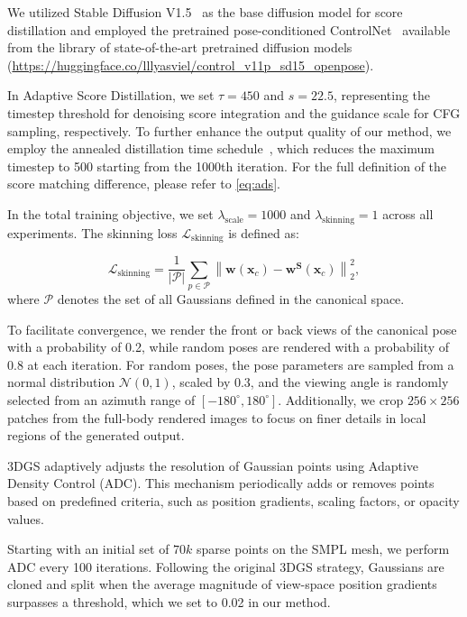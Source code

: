 We utilized Stable Diffusion V1.5~\cite{rombach2022high} as the base diffusion model for score distillation and employed the pretrained pose-conditioned ControlNet~\cite{zhang2023adding} available from the library of state-of-the-art pretrained diffusion models ({\small  \url{https://huggingface.co/lllyasviel/control_v11p_sd15_openpose}}).

In Adaptive Score Distillation, we set $\tau = 450$ and $s = 22.5$, representing the timestep threshold for denoising score integration and the guidance scale for CFG sampling, respectively.
To further enhance the output quality of our method, we employ the annealed distillation time schedule~\cite{wang2024prolificdreamer}, which reduces the maximum timestep to 500 starting from the 1000th iteration. For the full definition of the score matching difference, please refer to \eqref{eq:ads}.

In the total training objective, we set $\lambda_{\text{scale}} = 1000$ and $\lambda_{\text{skinning}} = 1$ across all experiments. The skinning loss $\mathcal{L}_{\text{skinning}}$ is defined as:

\begin{equation}
\mathcal{L}_{\text {skinning}}=\frac{1}{|\mathcal{P}|} \sum_{p \in \mathcal{P}} \left\|\mathbf{w}(\mathbf{x}_c)-\mathbf{w}^{\mathbf{S}}(\mathbf{x}_c)\right\|_2^2,
\label{eq:skinning}
\end{equation}
where $\mathcal{P}$ denotes the set of all Gaussians defined in the canonical space.     


To facilitate convergence, we render the front or back views of the canonical pose with a probability of 0.2, while random poses are rendered with a probability of 0.8 at each iteration.
For random poses, the pose parameters are sampled from a normal distribution $\mathcal{N}(0, 1)$, scaled by 0.3, and the viewing angle is randomly selected from an azimuth range of $[-180^\circ, 180^\circ]$. Additionally, we crop $256 \times 256$ patches from the full-body rendered images to focus on finer details in local regions of the generated output.

 3DGS adaptively adjusts the resolution of Gaussian points using Adaptive Density Control (ADC). This mechanism periodically adds or removes points based on predefined criteria, such as position gradients, scaling factors, or opacity values.

Starting with an initial set of $70k$ sparse points on the SMPL mesh, we perform ADC every 100 iterations. Following the original 3DGS strategy, Gaussians are cloned and split when the average magnitude of view-space position gradients surpasses a threshold, which we set to 0.02 in our method. 


